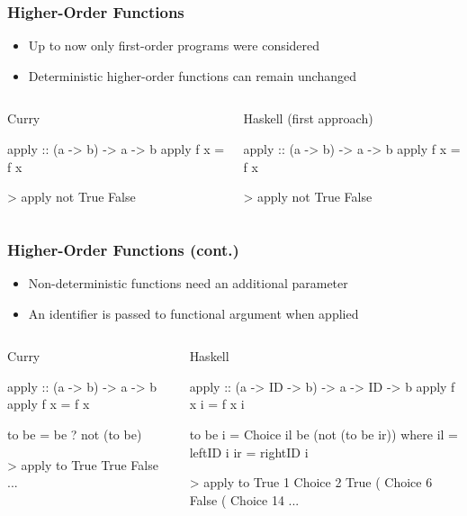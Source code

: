 \documentclass[utf8]{beamer}
\newenvironment{program}{\begin{semiverbatim}\small}{\end{semiverbatim}}
\begin{document}
\begin{frame}[fragile]
\frametitle{Higher-Order Functions}
\begin{itemize}
\item Up to now only first-order programs were considered
\item Deterministic higher-order functions can remain unchanged
\end{itemize}
\begin{columns}
\begin{block}{Curry}
\begin{program}
apply :: (a -> b) -> a -> b
apply f x = f x

> apply not True
False
\end{program}
\end{block}
\begin{block}{Haskell (first approach)}
\begin{program}
apply :: (a -> b) -> a -> b
apply f x = f x

> apply not True
False
\end{program}
\end{block}
\end{columns}
\end{frame}


\begin{frame}[fragile]
\frametitle{Higher-Order Functions (cont.)}
\begin{itemize}
\item Non-deterministic functions need an additional parameter
\item An identifier is passed to functional argument when applied
\end{itemize}
\begin{columns}[t]
\begin{block}{Curry}
\begin{program}
apply :: (a -> b) 
      -> a -> b
apply f x = f x

to be = be ? not (to be)

> apply to True
True
False
...
\end{program}
\end{block}
\begin{block}{Haskell}
\begin{program}
apply :: (a -> ID -> b) 
      -> a -> ID -> b
apply f x i = f x i

to be i = 
  Choice il be (not (to be ir))
  where il = leftID  i
        ir = rightID i

> apply to True 1
Choice 2 True (
Choice 6 False (
Choice 14 ...
\end{program}
\end{block}
\end{columns}
\end{frame}
\end{document}
